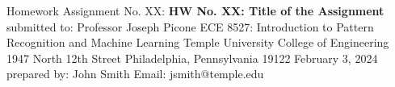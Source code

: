 \documentclass{article}
\begin{document}
    \begin{center}
        \large{Homework Assignment No. XX:}\break
        \break
        \large{\textbf{HW No. XX: Title of the Assignment}}\break
        \break
        \large{submitted to:}\break
        \break
        \large{Professor Joseph Picone}\break
        \large{ECE 8527: Introduction to Pattern Recognition and Machine Learning}\break
        \large{Temple University}\break
        \large{College of Engineering}\break
        \large{1947 North 12th Street}\break
        \large{Philadelphia, Pennsylvania 19122}\break
        \break
        \large{February 3, 2024}\break
        \break
        \large{prepared by: }\break
        \break
        \large{John Smith}\break
        \large{Email: jsmith@temple.edu}
    \end{center}
\end{document}
